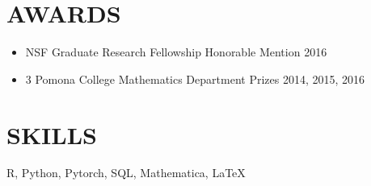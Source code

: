 \documentclass{simplecv}
\begin{document}


                
\section{AWARDS}
\begin{itemize}
  \item NSF Graduate Research Fellowship Honorable Mention \hfill 2016
  \item 3 Pomona College Mathematics Department Prizes \hfill 2014, 2015, 2016
\end{itemize}

\section{SKILLS}
\noindent R, Python, Pytorch, SQL, Mathematica, \LaTeX
\end{document}
